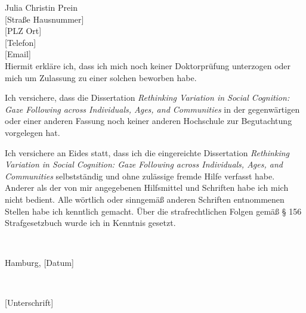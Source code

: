 \documentclass[
]{scrbook}
\begin{document}
Julia Christin Prein\\
{[}Straße Hausnummer{]}\\
{[}PLZ Ort{]}\\
{[}Telefon{]}\\
{[}Email{]}\\

Hiermit erkläre ich, dass ich mich noch keiner Doktorprüfung unterzogen oder mich um Zulassung zu einer solchen beworben habe.

Ich versichere, dass die Dissertation \emph{Rethinking Variation in Social Cognition: Gaze Following across Individuals, Ages, and Communities} in der gegenwärtigen oder einer anderen Fassung noch keiner anderen Hochschule zur Begutachtung vorgelegen hat.

Ich versichere an Eides statt, dass ich die eingereichte Dissertation \emph{Rethinking Variation in Social Cognition: Gaze Following across Individuals, Ages, and Communities} selbstständig und ohne zulässige fremde Hilfe verfasst habe. Anderer als der von mir angegebenen Hilfsmittel und Schriften habe ich mich nicht bedient. Alle wörtlich oder sinngemäß anderen Schriften entnommenen Stellen habe ich kenntlich gemacht. Über die strafrechtlichen Folgen gemäß § 156 Strafgesetzbuch wurde ich in Kenntnis gesetzt.

~

Hamburg, {[}Datum{]}

~

{[}Unterschrift{]}
\end{document}
